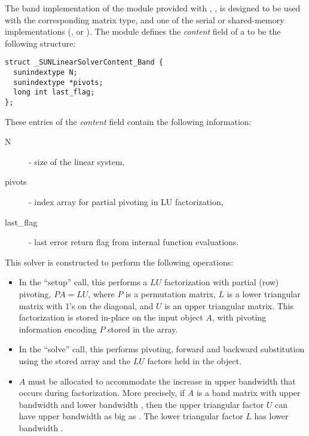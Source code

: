 
The band implementation of the {\sunlinsol} module provided with
{\sundials}, {\sunlinsolband}, is designed to be used with the
corresponding {\sunmatband} matrix type, and one of the serial or
shared-memory {\nvector} implementations ({\nvecs}, {\nvecopenmp} or
{\nvecpthreads}).  The {\sunlinsolband} module defines the {\em
content} field of a  to be the following structure:
\begin{verbatim} 
struct _SUNLinearSolverContent_Band {
  sunindextype N;
  sunindextype *pivots;
  long int last_flag;
};
\end{verbatim}
These entries of the \emph{content} field contain the following
information:
\begin{description}
  \item[N] - size of the linear system,
  \item[pivots] - index array for partial pivoting in LU factorization,
  \item[last\_flag] - last error return flag from internal function evaluations.
\end{description}

This solver is constructed to perform the following operations:
\begin{itemize}
\item In the ``setup'' call, this performs a $LU$ factorization with
  partial (row) pivoting, $PA=LU$, where $P$ is a permutation matrix,
  $L$ is a lower triangular matrix with 1's on the diagonal, and $U$
  is an upper triangular matrix.  This factorization is stored
  in-place on the input {\sunmatband} object $A$, with pivoting
  information encoding $P$ stored in the  array.
\item In the ``solve'' call, this performs pivoting, forward and
  backward substitution using the stored  array and the
  $LU$ factors held in the {\sunmatband} object.
\item
  {\warn} $A$ must be allocated to accommodate the increase in upper
  bandwidth that occurs during factorization.  More precisely, if $A$
  is a band matrix with upper bandwidth  and lower bandwidth
  , then the upper triangular factor $U$ can have upper
  bandwidth as big as . The lower triangular
  factor $L$ has lower bandwidth .
\end{itemize}


